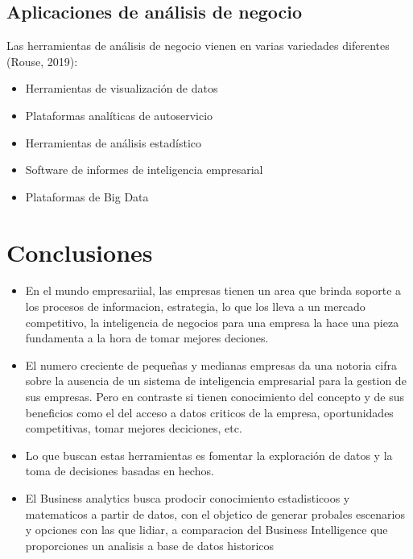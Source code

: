 \documentclass[twoside,twocolumn]{article}
\begin{document}
\subsection{Aplicaciones de análisis de negocio}
Las herramientas de análisis de negocio vienen en varias variedades diferentes (Rouse, 2019):
\begin{itemize}	

	\item Herramientas de visualización de datos
	\item Plataformas analíticas de autoservicio
	\item Herramientas de análisis estadístico
	\item Software de informes de inteligencia empresarial
	\item Plataformas de Big Data

\end{itemize} 



\section{Conclusiones}
\begin{itemize}	

	\item  En el mundo empresariial, las empresas tienen un area que brinda soporte a los procesos de informacion, estrategia, lo que los lleva a un mercado competitivo, la inteligencia de negocios para una empresa la hace una pieza fundamenta a la hora de tomar mejores deciones.
	\item El numero creciente de pequeñas y medianas empresas da una notoria cifra sobre la ausencia de un sistema de inteligencia empresarial para la gestion de sus empresas. Pero en contraste si tienen conocimiento del concepto y de sus beneficios como el del acceso a datos criticos de la empresa, oportunidades competitivas, tomar mejores deciciones, etc.
	\item Lo que buscan estas herramientas es fomentar la exploración de datos y la toma de decisiones basadas en hechos.
	\item El Business analytics busca prodocir conocimiento estadisticoos y matematicos a partir de datos, con el objetico de generar probales escenarios y opciones con las que lidiar, a comparacion del Business Intelligence que proporciones un analisis a base de datos historicos

\end{itemize} 
\end{document}
